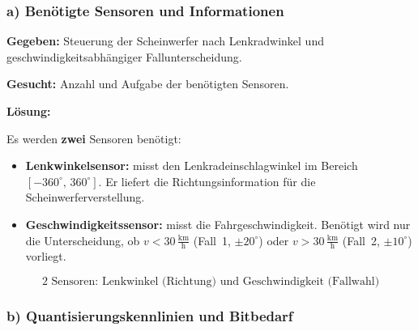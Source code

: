 \subsubsection*{a) Benötigte Sensoren und Informationen}

\begin{beispiel}

\textbf{Gegeben:} Steuerung der Scheinwerfer nach Lenkradwinkel und
geschwindigkeitsabhängiger Fallunterscheidung.

\textbf{Gesucht:} Anzahl und Aufgabe der benötigten Sensoren.

\textbf{Lösung:}

Es werden \textbf{zwei} Sensoren benötigt:

\begin{itemize}
  \item \textbf{Lenkwinkelsensor:} misst den Lenkradeinschlagwinkel im Bereich
        $[-360^\circ,\, 360^\circ]$. Er liefert die Richtungsinformation für die
        Scheinwerferverstellung.
  \item \textbf{Geschwindigkeitssensor:} misst die Fahrgeschwindigkeit. Benötigt
        wird nur die Unterscheidung, ob $v < 30\,\tfrac{\text{km}}{\text{h}}$
        (Fall~1, $\pm 20^\circ$) oder $v > 30\,\tfrac{\text{km}}{\text{h}}$
        (Fall~2, $\pm 10^\circ$) vorliegt.
\end{itemize}

$$
\boxed{\;\text{2 Sensoren: Lenkwinkel (Richtung) und Geschwindigkeit (Fallwahl)}\;}
$$

\end{beispiel}

\subsubsection*{b) Quantisierungskennlinien und Bitbedarf}

